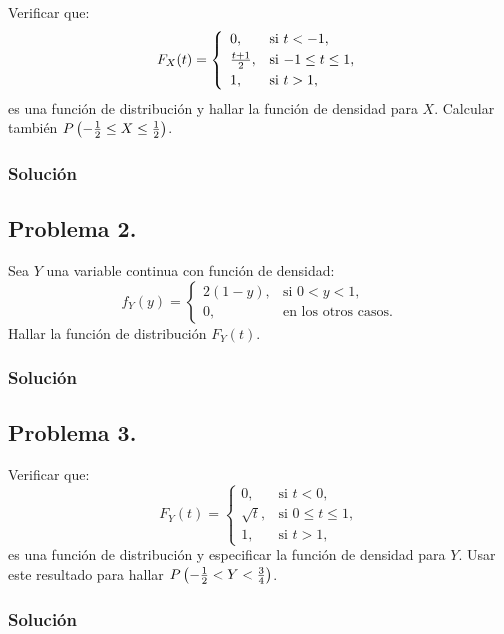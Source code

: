 \documentclass[]{article}
\begin{document}
{{Verificar que: \[
F_X (t)=
\left\{\begin{array}{ll}
0, & \mbox{si $t<-1$},
 \\[0.1cm]
{t+1\over 2}, & \mbox{si $-1\leq
t\leq 1$},
 \\[0.1cm]
1, & \mbox{si $t> 1$},
\end{array}\right.
\] es una función de distribución y hallar la función de densidad para
\(X\). Calcular también
\(P\left(-{1\over 2}\leq X\leq {1\over 2}\right)\).

\hypertarget{soluciuxf3n-6}{%
\subsubsection{Solución}\label{soluciuxf3n-6}}

\hypertarget{problema-2.-1}{%
\subsection{Problema 2.}\label{problema-2.-1}}

Sea \(Y\) una variable continua con función de densidad: \[
f_Y(y)=
\left\{\begin{array}{ll}
2(1-y), & \mbox{si $0<y<1$},\\ 0, & \mbox{en los otros casos}.
\end{array}\right.
\] Hallar la función de distribución \(F_Y(t)\).

\hypertarget{soluciuxf3n-7}{%
\subsubsection{Solución}\label{soluciuxf3n-7}}

\hypertarget{problema-3.-1}{%
\subsection{Problema 3.}\label{problema-3.-1}}

Verificar que: \[
F_Y(t)=
\left\{\begin{array}{ll}
0, & \mbox{si $t<0$},\\
\sqrt{t}, & \mbox{si $0\leq t\leq 1$},\\ 1, &
\mbox{si $t>1$},
\end{array}\right.
\] es una función de distribución y especificar la función de densidad
para \(Y\). Usar este resultado para hallar
\(P\left(-{1\over 2}<Y<{3\over 4}\right)\).

\hypertarget{soluciuxf3n-8}{%
\subsubsection{Solución}\label{soluciuxf3n-8}}

}}
\end{document}

